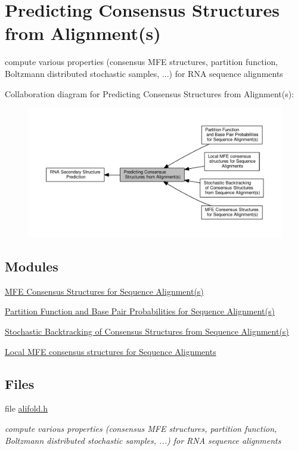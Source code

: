 \hypertarget{group__consensus__fold}{}\section{Predicting Consensus Structures from Alignment(s)}
\label{group__consensus__fold}


compute various properties (consensus M\+FE structures, partition function, Boltzmann distributed stochastic samples, ...) for R\+NA sequence alignments  


Collaboration diagram for Predicting Consensus Structures from Alignment(s)\+:
\nopagebreak
\begin{figure}[H]
\begin{center}
\leavevmode
\includegraphics[width=350pt]{group__consensus__fold}
\end{center}
\end{figure}
\subsection*{Modules}
\begin{DoxyCompactItemize}
\item 
\hyperlink{group__consensus__mfe__fold}{M\+F\+E Consensus Structures for Sequence Alignment(s)}
\item 
\hyperlink{group__consensus__pf__fold}{Partition Function and Base Pair Probabilities for Sequence Alignment(s)}
\item 
\hyperlink{group__consensus__stochbt}{Stochastic Backtracking of Consensus Structures from Sequence Alignment(s)}
\item 
\hyperlink{group__local__consensus__fold}{Local M\+F\+E consensus structures for Sequence Alignments}
\end{DoxyCompactItemize}
\subsection*{Files}
\begin{DoxyCompactItemize}
\item 
file \hyperlink{alifold_8h}{alifold.\+h}
\begin{DoxyCompactList}\small\item\em compute various properties (consensus M\+FE structures, partition function, Boltzmann distributed stochastic samples, ...) for R\+NA sequence alignments \end{DoxyCompactList}\end{DoxyCompactItemize}
